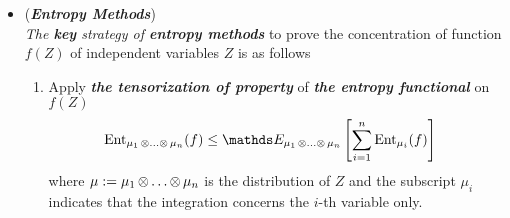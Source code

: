 \documentclass[11pt]{article}
\begin{document}
\begin{itemize}
%

\item \begin{remark} (\textbf{\emph{Entropy Methods}})\\
\emph{The \textbf{key} strategy of \textbf{entropy methods}} to prove the concentration of function $f(Z)$ of independent variables $Z$  is as follows
\begin{enumerate}
\item Apply \emph{\textbf{the tensorization of property}} of \emph{\textbf{the entropy functional}} on $f(Z)$ 
\begin{align*}
\text{Ent}_{\mu_1 \xdotx{\otimes} \mu_n}(f) &\le \E{\mu_1 \xdotx{\otimes} \mu_n}{\sum_{i=1}^{n}\text{Ent}_{\mu_i}(f)}
\end{align*} where $\mu := \mu_1 \,{\otimes}\ldots{\otimes}\, \mu_n$ is the distribution of $Z$ and the subscript $\mu_i$ indicates that the integration concerns the $i$-th variable only.


\end{enumerate}
\end{remark}
\end{itemize}
\end{document}
